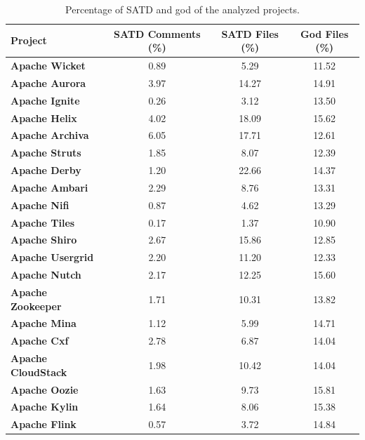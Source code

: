 \begin{landscape}
	
	
	
	\begin{table}[htbp]
		\small
		\centering
		\caption{Percentage of SATD and god of the analyzed projects.}
		\begin{adjustbox}{width=1.0\textwidth}
			
			
			\begin{tabular}{l|c|c|c}
				\hline
				\textbf{Project}  & \textbf{SATD Comments (\%)}  & \textbf{SATD Files (\%)} & \textbf{God Files (\%)} \\ \hline
				\textbf{Apache Wicket} &  0.89 & 5.29 & 11.52    \\ \hline
				\textbf{Apache Aurora} &  3.97 & 14.27 & 14.91    \\ \hline
				\textbf{Apache Ignite} &  0.26 & 3.12 & 13.50   \\ \hline
				\textbf{Apache Helix} &  4.02 & 18.09 & 15.62    \\ \hline
				\textbf{Apache Archiva} &  6.05 & 17.71 & 12.61    \\ \hline
				\textbf{Apache Struts} &  1.85 & 8.07 & 12.39    \\ \hline
				\textbf{Apache Derby} &  1.20 & 22.66 & 14.37    \\ \hline
				\textbf{Apache Ambari} &  2.29 & 8.76 & 13.31   \\ \hline
				\textbf{Apache Nifi} &  0.87 & 4.62 & 13.29    \\ \hline
				\textbf{Apache Tiles} &  0.17 & 1.37 & 10.90    \\ \hline
				\textbf{Apache Shiro} &  2.67 & 15.86 & 12.85    \\ \hline
				\textbf{Apache Usergrid} &  2.20 & 11.20 & 12.33    \\ \hline
				\textbf{Apache Nutch} &  2.17 & 12.25 & 15.60    \\ \hline
				\textbf{Apache Zookeeper} &  1.71 & 10.31 & 13.82   \\ \hline
				\textbf{Apache Mina} &  1.12 & 5.99 & 14.71   \\ \hline
				\textbf{Apache Cxf} &  2.78 & 6.87 & 14.04   \\ \hline
				\textbf{Apache CloudStack} &  1.98 & 10.42 & 14.04   \\ \hline
				\textbf{Apache Oozie} &  1.63 & 9.73 & 15.81   \\ \hline
				\textbf{Apache Kylin} &  1.64 & 8.06 & 15.38   \\ \hline
				\textbf{Apache Flink} &  0.57 & 3.72 & 14.84   \\ \hline
				
			\end{tabular}
			\label{table:projects_satd_god_percentage2}
			
		\end{adjustbox}
		
	\end{table}
	
\end{landscape}

